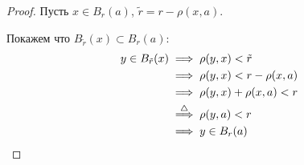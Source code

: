 \begin{properties}
\begin{enumerate}
\begin{proof}
                Пусть $x\in B_{r}(a)$, $\tilde{r} = r - \rho(x, a)$.

                Покажем что $B_{\tilde{r}}(x) \subset B_{r}(a)$:
                \begin{equation*}
                    \begin{split}
                        y\in B_{\tilde{r}}(x) 
                        &\implies \rho(y, x) < \tilde{r}\\
                        &\implies \rho(y, x) < r - \rho(x, a)\\
                        &\implies \rho(y, x) + \rho(x, a) < r\\
                        & \overset{\triangle}{\implies} \rho(y, a) < r\\
                        &\implies y\in B_{r}(a) \qedhere
                    \end{split}
                \end{equation*}
            \end{proof}
    \end{enumerate}
\end{properties}
